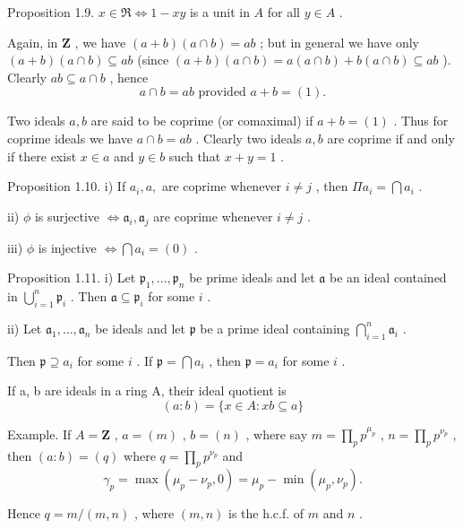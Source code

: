 \documentclass[]{article}
\begin{document}
Proposition 1.9. $x \in \Re \Leftrightarrow 1 - xy$ is a unit in $A$ for all $y \in A$ . 

Again, in $\mathbf{Z}$ , we have $(a + b)(a \cap b) = ab$ ; but in general we have only $(a + b)(a \cap b) \subseteq ab$ (since $(a + b)(a \cap b) = a(a \cap b) + b(a \cap b) \subseteq ab$ ). Clearly $ab \subseteq a \cap b$ , hence $$
a \cap b = a b \text {   provided   } a + b = (1).
$$

Two ideals $a, b$ are said to be coprime (or comaximal) if $a + b = (1)$ . Thus for coprime ideals we have $a \cap b = ab$ . Clearly two ideals $a, b$ are coprime if and only if there exist $x \in a$ and $y \in b$ such that $x + y = 1$ . 

Proposition 1.10. i) If $a_{i}, a,$ are coprime whenever $i \neq j$ , then $\Pi a_{i} = \bigcap a_{i}$ . 

ii) $\phi$ is surjective $\Leftrightarrow \mathfrak{a}_i, \mathfrak{a}_j$ are coprime whenever $i \neq j$ . 

iii) $\phi$ is injective $\Leftrightarrow \bigcap a_{i} = (0)$ . 

Proposition 1.11. i) Let $\mathfrak{p}_1, \ldots, \mathfrak{p}_n$ be prime ideals and let $\mathfrak{a}$ be an ideal contained in $\bigcup_{i=1}^n \mathfrak{p}_i$ . Then $\mathfrak{a} \subseteq \mathfrak{p}_i$ for some $i$ . 

ii) Let $\mathfrak{a}_1, \ldots, \mathfrak{a}_n$ be ideals and let $\mathfrak{p}$ be a prime ideal containing $\bigcap_{i=1}^{n} \mathfrak{a}_i$ . 

Then $\mathfrak{p} \supseteq a_i$ for some $i$ . If $\mathfrak{p} = \bigcap a_i$ , then $\mathfrak{p} = a_i$ for some $i$ . 

If a, b are ideals in a ring A, their ideal quotient is $$
(a: b) = \{x \in A: x b \subseteq a \}
$$

Example. If $A = \mathbf{Z}$ , $a = (m)$ , $b = (n)$ , where say $m = \prod_{p} p^{\mu_p}$ , $n = \prod_{p} p^{\nu_p}$ , then $(a:b) = (q)$ where $q = \prod_{p} p^{\nu_p}$ and $$
\gamma_ {p} = \max (\mu_ {p} - \nu_ {p}, 0) = \mu_ {p} - \min (\mu_ {p}, \nu_ {p}).
$$

Hence $q = m / (m, n)$ , where $(m, n)$ is the h.c.f. of $m$ and $n$ . 
\end{document}
